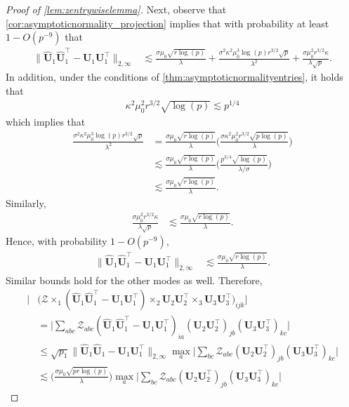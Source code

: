 \documentclass[10pt]{article}
\newcommand{\0}{{\mathbf{0}}}
\newcommand{\1}{{\mathbf{1}}}
\newcommand{\U}{{\mathbf{U}}}
\renewcommand{\t}{^{\top}}
\newcommand{\uhat}{\mathbf{\hat{U}}}
\renewcommand{\hat}{\widehat}
\renewcommand{\hat}{\widehat}
\begin{document}
\begin{proof}[Proof of \cref{lem:zentrywiselemma}]
Next, observe that \cref{cor:asymptoticnormality_projection} implies that with probability at least $1- O(p^{-9})$ that
\begin{align*}
    \| \uhat_1 \uhat_1\t - \U_1 \U_1\t \|_{2,\infty} &\lesssim \frac{\sigma\mu_0 \sqrt{r \log(p)}}{\lambda} + \frac{\sigma^2 \kappa^2 \mu_0^3 \log(p) r^{3/2} \sqrt{p}}{\lambda^2}   + \frac{\sigma \mu_0^2 r^{3/2} \kappa}{\lambda \sqrt{p}}.  
\end{align*}
In addition, under the conditions of \cref{thm:asymptoticnormalityentries}, it holds that
\begin{align*}
  \kappa^2 \mu_0^2 r^{3/2} \sqrt{\log(p)} \lesssim p^{1/4}
\end{align*}
which implies that
\begin{align*}
\frac{\sigma^2 \kappa^2 \mu_0^3 \log(p) r^{3/2} \sqrt{p}}{\lambda^2} &=  \frac{\sigma \mu_0 \sqrt{r\log(p)}}{\lambda} \bigg( \frac{\sigma \kappa^2 \mu_0^2 r^{3/2} \sqrt{p\log(p)} }{\lambda} \bigg) \\
&\lesssim \frac{\sigma \mu_0 \sqrt{r\log(p)}}{\lambda} \bigg( \frac{p^{3/4} \sqrt{\log(p)}}{\lambda/\sigma} \bigg)\\
&\lesssim \frac{\sigma \mu_0 \sqrt{r\log(p)}}{\lambda}.
\end{align*}
Similarly,
\begin{align*}
    \frac{\sigma \mu_0^2 r^{3/2} \kappa}{\lambda \sqrt{p}} &\lesssim \frac{\sigma \mu_0 \sqrt{r\log(p)}}{\lambda}.
\end{align*}
Hence, with probability $1 - O(p^{-9})$,
\begin{align}
    \| \uhat_1 \uhat_1\t - \U_1 \U_1\t \|_{2,\infty} &\lesssim \frac{\sigma \mu_0 \sqrt{r\log(p)}}{\lambda}. \label{eq:projbound}
\end{align}
Similar bounds hold for the other modes as well. Therefore,
\begin{align*}
     \bigg| &\bigg( \mathcal{Z} \times_1 (\uhat_1 \uhat_1\t - \U_1 \U_1\t) \times_2  \U_2 \U_2\t\times_3 \U_3 \U_3\t \bigg)_{ijk} \bigg| \\
     &= \bigg| \sum_{abc}\mathcal{Z}_{abc}(\uhat_1 \uhat_1\t - \U_1 \U_1\t)_{ia} (\U_2 \U_2\t)_{jb} (\U_3 \U_3\t)_{kc} \bigg| \\
     &\leq \sqrt{p_1} \| \uhat_1 \uhat_1- \U_1\U_1\t \|_{2,\infty} \max_{a} \bigg| \sum_{bc} \mathcal{Z}_{abc}(\U_2 \U_2\t)_{jb} (\U_3 \U_3\t)_{kc} \bigg| \\
     &\lesssim \bigg(\frac{\sigma \mu_0 \sqrt{pr\log(p)}}{\lambda} \bigg) \max_{a} \bigg| \sum_{bc} \mathcal{Z}_{abc}(\U_2 \U_2\t)_{jb} (\U_3 \U_3\t)_{kc} \bigg|

\end{align*}
\end{proof}
\end{document}
